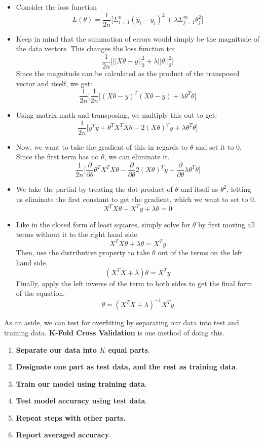\documentclass{article}
\begin{document}
\begin{itemize}
    \item Consider the loss function
     $$L(\theta) = \frac{1}{2n}\bigg[\Sigma^n_{i=1}(\hat{y}_i - y_i)^2 + \lambda\Sigma^m_{j=1}\theta_j^2\bigg]$$
    
    \item Keep in mind that the summation of errors would simply be the magnitude of the data vectors. This changes the loss function to:
    $$\frac{1}{2n}\bigg[||X\theta - y||^2_2 + \lambda||\theta||^2_2\bigg]$$
    Since the magnitude can be calculated as the product of the transposed vector and itself, we get:
    $$\frac{1}{2n}\bigg[\frac{1}{2n}[(X\theta -y)^T(X\theta -y) + \lambda\theta^T\theta\bigg]$$
    
    \item Using matrix math and transposing, we multiply this out to get:
    $$\frac{1}{2n}\bigg[y^Ty + \theta^TX^TX\theta - 2(X\theta)^Ty + \lambda\theta^T\theta\bigg]$$
    
    \item Now, we want to take the gradient of this in regards to $\theta$ and set it to 0. Since the first term has no $\theta$, we can eliminate it. 
    $$\frac{1}{2n}\bigg[\frac{\partial}{\partial\theta}\theta^TX^TX\theta - \frac{\partial}{\partial\theta}2(X\theta)^Ty + \frac{\partial}{\partial\theta}\lambda\theta^T\theta\bigg]$$
    
    \item We take the partial by treating the dot product of $\theta$ and itself as $\theta^2$, letting us eliminate the first constant to get the gradient, which we want to set to 0.
    $$ X^TX\theta - X^Ty + \lambda\theta = 0$$
    
    \item Like in the closed form of least squares, simply solve for $\theta$ by first moving all terms without it to the right hand side. 
    $$ X^TX\theta + \lambda\theta = X^Ty$$
    Then, use the distributive property to take $\theta$ out of the terms on the left hand side.
    $$ (X^TX + \lambda)\theta = X^Ty$$
    Finally, apply the left inverse of the term to both sides to get the final form of the equation. 
    $$ \theta = (X^TX + \lambda)^{-1}X^Ty$$
    
    
\end{itemize}
As an aside, we can test for overfitting by separating our data into test and training data.
\textbf{K-Fold Cross Validation} is one method of doing this.
\begin{enumerate}
    \item \textbf{Separate our data into $K$ equal parts}. 
    \item \textbf{Designate one part as test data, and the rest as training data}.
    \item \textbf{Train our model using training data}.
    \item \textbf{Test model accuracy using test data}.
    \item \textbf{Repeat steps with other parts.}
    \item \textbf{Report averaged accuracy}.
\end{enumerate}
\end{document}
